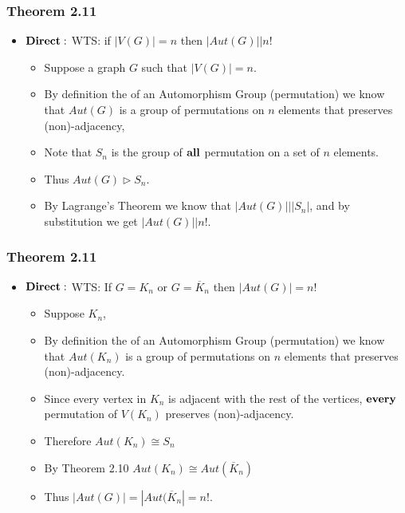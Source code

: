\documentclass{beamer}
\begin{document}
\begin{frame}
\frametitle{Theorem 2.11}
\begin{center}
\begin{itemize}
	\item $\bold{Direct:}$ WTS: if $|V(G)| = n$ then $|Aut(G)| \bigl\vert n!$
		\begin{itemize}
			\item Suppose a graph $G$ such that $|V(G)| = n$.
			\vfill
			\item By definition the of an Automorphism Group (permutation) we know that $Aut(G)$ is a group of permutations on $n$ elements that preserves (non)-adjacency,
			\vfill
			\item Note that $S_n$ is the group of $\bold{all}$ permutation on a set of $n$ elements. 
			\vfill
			\item Thus $Aut(G) \triangleright S_n$.
			\vfill
			\item By Lagrange's Theorem we know that $|Aut(G)| \bigl\vert |S_n|$, and by substitution we get $|Aut(G)| \bigl\vert n!$. 
		\end{itemize}
\end{itemize}
\end{center}
\end{frame}


\begin{frame}
\frametitle{Theorem 2.11}
\begin{center}
\begin{itemize}
	\item $\bold{Direct:}$ WTS: If $G = K_n$ or $G = \overline{K}_n$ then $|Aut(G)| = n!$
		\begin{itemize}
		\item Suppose $K_n$,
		\vfill
		\item By definition the of an Automorphism Group (permutation) we know that $Aut(K_n)$ is a group of permutations on $n$ elements that preserves (non)-adjacency.
		\vfill
		\item Since every vertex in $K_n$ is adjacent with the rest of the vertices, $\bold{every}$ permutation of $V(K_n)$ preserves (non)-adjacency.
		\vfill
		\item Therefore $Aut(K_n) \cong S_n$
		\vfill
		\item By Theorem 2.10 $Aut(K_n) \cong  Aut(\overline{K}_n)$
		\vfill
		\item Thus $|Aut(G)| = |Aut(\overline{K}_n| = n!.$
		\end{itemize}
\end{itemize}
\end{center}
\end{frame}
\end{document}
